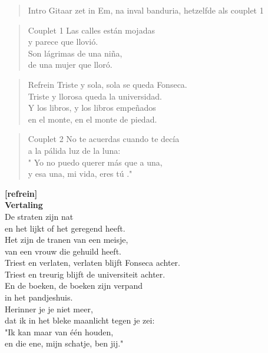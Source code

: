 
\begin{verse}{Intro}
Gitaar zet in Em, na inval banduria, hetzelfde als couplet 1
\end{verse}
\begin{verse}{Couplet 1}
Las calles están mojadas\\
y parece que llovió.\\
Son lágrimas de una niña,\\
de una mujer que lloró.\\
\end{verse}

\begin{verse}{Refrein}
Triste y sola, sola se queda Fonseca.\\
Triste y llorosa queda la universidad.\\
Y los libros, y los libros empeñados\\
en el monte, en el monte de piedad.\\
\end{verse}

\begin{verse}{Couplet 2}
No te acuerdas cuando te decía\\
a la pálida luz de la luna:\\
\chord{}" Yo no puedo querer más que a una,\\
y esa una, mi vida, eres tú ."\\
\end{verse}

\textbf{[refrein]}\\
\clearpage
\textbf{Vertaling}\\
De straten zijn nat\\
en het lijkt of het geregend heeft.\\
Het zijn de tranen van een meisje,\\
van een vrouw die gehuild heeft.\\\vspace{1em}
Triest en verlaten, verlaten blijft Fonseca achter.\\
Triest en treurig blijft de universiteit achter.\\
En de boeken, de boeken zijn verpand\\
in het pandjeshuis.\\\vspace{1em}
Herinner je je niet meer,\\
dat ik in het bleke maanlicht tegen je zei:\\
"\hspace{0.1em}Ik kan maar van één houden,\\
en die ene, mijn schatje, ben jij."\\